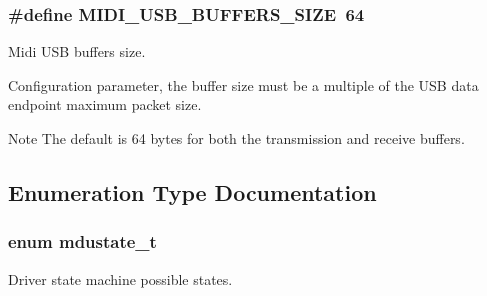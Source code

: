 \subsubsection[{\texorpdfstring{M\+I\+D\+I\+\_\+\+U\+S\+B\+\_\+\+B\+U\+F\+F\+E\+R\+S\+\_\+\+S\+I\+ZE}{MIDI_USB_BUFFERS_SIZE}}]{\setlength{\rightskip}{0pt plus 5cm}\#define M\+I\+D\+I\+\_\+\+U\+S\+B\+\_\+\+B\+U\+F\+F\+E\+R\+S\+\_\+\+S\+I\+ZE~64}\hypertarget{group__MIDI__USB_ga76b9bd9d7068efe165b409fad9c63fc5}{}\label{group__MIDI__USB_ga76b9bd9d7068efe165b409fad9c63fc5}


Midi U\+SB buffers size. 

Configuration parameter, the buffer size must be a multiple of the U\+SB data endpoint maximum packet size. \begin{DoxyNote}{Note}
The default is 64 bytes for both the transmission and receive buffers. 
\end{DoxyNote}


\subsection{Enumeration Type Documentation}
\subsubsection[{\texorpdfstring{mdustate\+\_\+t}{mdustate_t}}]{\setlength{\rightskip}{0pt plus 5cm}enum {\bf mdustate\+\_\+t}}\hypertarget{group__MIDI__USB_gaf100a937cc2fe8a2a694884d6ec92485}{}\label{group__MIDI__USB_gaf100a937cc2fe8a2a694884d6ec92485}


Driver state machine possible states. 

